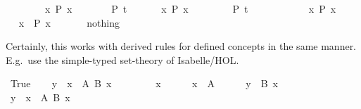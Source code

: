 \begin{isabellebody}
\isanewline
\ \ \isamarkupfalse%
\isanewline
\isanewline
\ \ \isamarkupfalse%
\isacommand{{\isacharbraceleft}}\ \isamarkupfalse%
\ {\isachardoublequote}{\isasymforall}x{\isachardot}\ P\ x{\isachardoublequote}\isanewline
\ \ \ \ \isamarkupfalse%
\ \isamarkupfalse%
\ {\isachardoublequote}P\ t{\isachardoublequote}\ \isamarkupfalse%
\isacommand{{\isachardot}{\isachardot}}\ \isamarkupfalse%
\isacommand{{\isacharbraceright}}\isanewline
\isanewline
\ \ \isamarkupfalse%
\ {\isachardoublequote}{\isasymexists}x{\isachardot}\ P\ x{\isachardoublequote}\isanewline
\ \ \isamarkupfalse%
\isanewline
\ \ \ \ \isamarkupfalse%
\ {\isachardoublequote}P\ t{\isachardoublequote}\ \isamarkupfalse%
\isanewline
\ \ \isamarkupfalse%
\isanewline
\ \ \isanewline
\ \ \isamarkupfalse%
\isacommand{{\isacharbraceleft}}\ \isamarkupfalse%
\ {\isachardoublequote}{\isasymexists}x{\isachardot}\ P\ x{\isachardoublequote}\isanewline
\ \ \ \ \isamarkupfalse%
\ \isamarkupfalse%
\ x\ \ {\isachardoublequote}P\ x{\isachardoublequote}\ \isamarkupfalse%
\isacommand{{\isachardot}{\isachardot}}\isanewline
\ \ \ \ \isamarkupfalse%
\ nothing\ \ %
\ \isamarkupfalse%
\isacommand{{\isacharbraceright}}\isanewline
\isamarkupfalse%
\isamarkupfalse%
%
\begin{isamarkuptext}%
Certainly, this works with derived rules for defined concepts in the
  same manner.  E.g.\ use the simple-typed set-theory of Isabelle/HOL.%
\end{isamarkuptext}%
\isamarkuptrue%
\ True\isanewline
\isamarkupfalse%
\isanewline
\ \ \isamarkupfalse%
\ {\isachardoublequote}y\ {\isasymin}\ {\isacharparenleft}{\isasymInter}x\ {\isasymin}\ A{\isachardot}\ B\ x{\isacharparenright}{\isachardoublequote}\isanewline
\ \ \isamarkupfalse%
\isanewline
\ \ \ \ \isamarkupfalse%
\ x\isanewline
\ \ \ \ \isamarkupfalse%
\ {\isachardoublequote}x\ {\isasymin}\ A{\isachardoublequote}\isanewline
\ \ \ \ \isamarkupfalse%
\ {\isachardoublequote}y\ {\isasymin}\ B\ x{\isachardoublequote}\ \isamarkupfalse%
\isanewline
\ \ \isamarkupfalse%
\isanewline
\isanewline
\ \ \isamarkupfalse%
\ {\isachardoublequote}y\ {\isasymin}\ {\isacharparenleft}{\isasymUnion}x\ {\isasymin}\ A{\isachardot}\ B\ x{\isacharparenright}{\isachardoublequote}\isanewline

\end{isabellebody}
